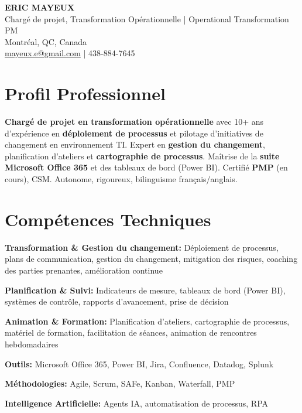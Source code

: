 \documentclass[11pt,a4paper]{article}
\begin{document}
\begin{center}
    {\LARGE \textbf{ERIC MAYEUX}}\\
    \vspace{4pt}
    {\large Chargé de projet, Transformation Opérationnelle | Operational Transformation PM}\\
    \vspace{4pt}
    Montréal, QC, Canada\\
    \href{mailto:mayeux.e@gmail.com}{mayeux.e@gmail.com} | 438-884-7645
\end{center}

\vspace{8pt}

\section*{Profil Professionnel}
\noindent
\textbf{Chargé de projet en transformation opérationnelle} avec 10+ ans d'expérience en \textbf{déploiement de processus} et pilotage d'initiatives de changement en environnement TI. Expert en \textbf{gestion du changement}, planification d'ateliers et \textbf{cartographie de processus}. Maîtrise de la \textbf{suite Microsoft Office 365} et des tableaux de bord (Power BI). Certifié \textbf{PMP} (en cours), CSM. Autonome, rigoureux, bilinguisme français/anglais.

\section*{Compétences Techniques}

\textbf{Transformation \& Gestion du changement:} Déploiement de processus, plans de communication, gestion du changement, mitigation des risques, coaching des parties prenantes, amélioration continue

\textbf{Planification \& Suivi:} Indicateurs de mesure, tableaux de bord (Power BI), systèmes de contrôle, rapports d'avancement, prise de décision

\textbf{Animation \& Formation:} Planification d'ateliers, cartographie de processus, matériel de formation, facilitation de séances, animation de rencontres hebdomadaires

\textbf{Outils:} Microsoft Office 365, Power BI, Jira, Confluence, Datadog, Splunk

\textbf{Méthodologies:} Agile, Scrum, SAFe, Kanban, Waterfall, PMP

\textbf{Intelligence Artificielle:} Agents IA, automatisation de processus, RPA
\end{document}
